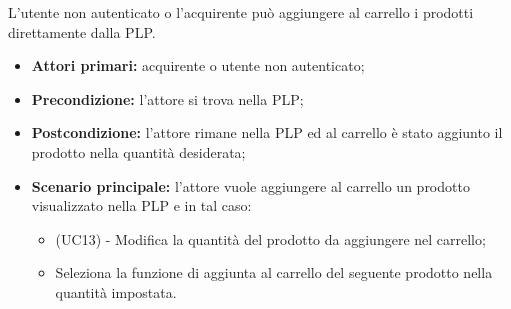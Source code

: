 
L'utente non autenticato o l'acquirente può aggiungere al carrello i prodotti direttamente dalla PLP.
\begin{itemize}
    \item \textbf{Attori primari:} acquirente o utente non autenticato;
    \item \textbf{Precondizione:} l'attore si trova nella PLP;
    \item \textbf{Postcondizione:} l'attore rimane nella PLP ed al carrello è stato aggiunto il prodotto nella quantità desiderata;
    \item \textbf{Scenario principale:} l'attore vuole aggiungere al carrello un prodotto visualizzato nella PLP e in tal caso:
    \begin{itemize}
        \item (UC13) - Modifica la quantità del prodotto da aggiungere nel carrello;
        \item Seleziona la funzione di aggiunta al carrello del seguente prodotto nella quantità impostata.
    \end{itemize}
\end{itemize}